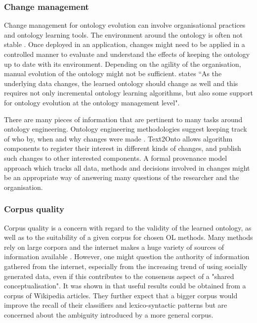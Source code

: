 \documentclass[a4paper]{report}
\begin{document}
\subsubsection{Change management}

Change management for ontology evolution can involve organisational practices and ontology learning tools.
The environment around the ontology is often not stable \cite{Blomqvist09Thesis}.
Once deployed in an application, changes might need to be applied in a controlled manner to evaluate and understand the effects of keeping the ontology up to date with its environment\cite{HOO2009OntEngMeth}.
Depending on the agility of the organisation, manual evolution of the ontology might not be sufficient\cite{Blomqvist09Thesis}.
\cite{Cimiano2009OL} states ``As the underlying data changes, the learned ontology should change as well and this requires not only incremental ontology learning algorithms, but also some support for ontology evolution at the ontology management level".

There are many pieces of information that are pertinent to many tasks around ontology engineering.
Ontology engineering methodologies suggest keeping track of who by, when and why changes were made \cite{HOO2009OntEngMeth}.
Text2Onto allows algorithm components to register their interest in different kinds of changes, and publish such changes to other interested components\cite{Cimiano2005Text2Onto}.
A formal provenance model approach\citep{Groth09PipeProv} which tracks all data, methods and decisions involved in changes might be an appropriate way of answering many questions of the researcher and the organisation.

\subsubsection{Corpus quality}

Corpus quality is a concern with regard to the validity of the learned ontology, as well as to the suitability of a given corpus for chosen OL methods.
Many methods rely on large corpora\cite{Cimiano06} and the internet makes a huge variety of sources of information available \cite{Wong11Survey}.
However, one might question the authority of information gathered from the internet, especially from the increasing trend of using socially generated data, even if this contributes to the consensus aspect of a "shared conceptualisation"\cite{Wong11Survey}.
It was shown in \cite{Hjelm09Thesis} that useful results could be obtained from a corpus of Wikipedia articles.
They further expect that a bigger corpus would improve the recall of their classifiers and lexico-syntactic patterns but are concerned about the ambiguity introduced by a more general corpus\cite{Hjelm09Thesis}. 
\end{document}
